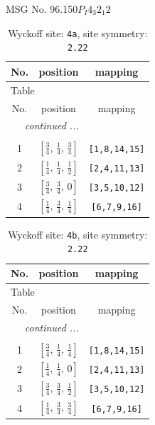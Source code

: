 \documentclass[fleqn,8pt]{jsarticle}
\begin{document}
\setcounter{MaxMatrixCols}{32}

\renewcommand{\tablename}{Table~}
\renewcommand{\figurename}{Figure~}
\begin{center}
\LARGE
MSG No. 96.150\quad$P_{I}4_{3}2_{1}2$
\end{center}
\renewcommand{\arraystretch}{1.2}
\begin{longtable}{ccc}
\caption{Wyckoff site: {\tt 4a}, site symmetry: {\tt 2.22}}
 \\
 \hline \hline
No. & position & mapping \\ \hline \endfirsthead

\multicolumn{2}{l}{\tablename\ \thetable{}} \\
 \hline \hline
No. & position & mapping \\ \hline \endhead

 \hline \hline
\multicolumn{2}{r}{\footnotesize\it continued ...} \\ \endfoot

 \hline \hline
\multicolumn{2}{r}{} \\ \endlastfoot

1 & $\left[ \frac{3}{4},\, \frac{1}{4},\, \frac{3}{4} \right]$ & {\tt [1,8,14,15]} \\ \hline
2 & $\left[ \frac{1}{4},\, \frac{1}{4},\, \frac{1}{2} \right]$ & {\tt [2,4,11,13]} \\ \hline
3 & $\left[ \frac{3}{4},\, \frac{3}{4},\, 0 \right]$ & {\tt [3,5,10,12]} \\ \hline
4 & $\left[ \frac{1}{4},\, \frac{3}{4},\, \frac{1}{4} \right]$ & {\tt [6,7,9,16]} \\
\end{longtable}
\renewcommand{\arraystretch}{1.2}
\begin{longtable}{ccc}
\caption{Wyckoff site: {\tt 4b}, site symmetry: {\tt 2.22}}
 \\
 \hline \hline
No. & position & mapping \\ \hline \endfirsthead

\multicolumn{2}{l}{\tablename\ \thetable{}} \\
 \hline \hline
No. & position & mapping \\ \hline \endhead

 \hline \hline
\multicolumn{2}{r}{\footnotesize\it continued ...} \\ \endfoot

 \hline \hline
\multicolumn{2}{r}{} \\ \endlastfoot

1 & $\left[ \frac{3}{4},\, \frac{1}{4},\, \frac{1}{4} \right]$ & {\tt [1,8,14,15]} \\ \hline
2 & $\left[ \frac{1}{4},\, \frac{1}{4},\, 0 \right]$ & {\tt [2,4,11,13]} \\ \hline
3 & $\left[ \frac{3}{4},\, \frac{3}{4},\, \frac{1}{2} \right]$ & {\tt [3,5,10,12]} \\ \hline
4 & $\left[ \frac{1}{4},\, \frac{3}{4},\, \frac{3}{4} \right]$ & {\tt [6,7,9,16]} \\
\end{longtable}
\end{document}
